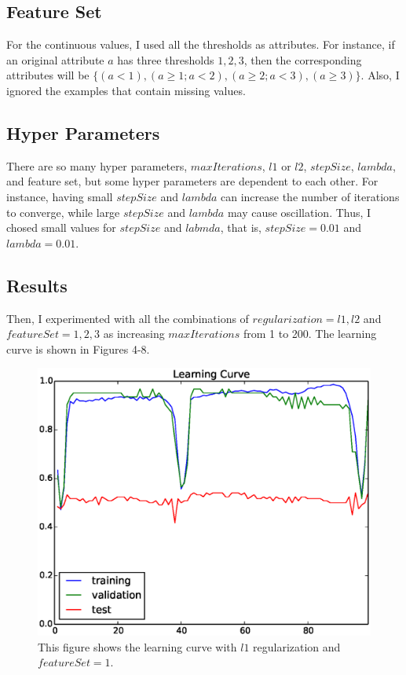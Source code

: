 \subsection*{Feature Set}
For the continuous values, I used all the thresholds as attributes. For instance, if an original attribute $a$ has three thresholds ${1, 2, 3}$, then the corresponding attributes will be $\{(a<1),(a\ge 1; a<2),(a\ge 2; a<3),(a\ge 3)\}$. Also, I ignored the examples that contain missing values.

\subsection*{Hyper Parameters}
There are so many hyper parameters, $maxIterations$, $l1$ or $l2$, $stepSize$, $lambda$, and feature set, but some hyper parameters are dependent to each other. For instance, having small $stepSize$ and $lambda$ can increase the number of iterations to converge, while large $stepSize$ and $lambda$ may cause oscillation. Thus, I chosed small values for $stepSize$ and $labmda$, that is, $stepSize=0.01$ and $lambda=0.01$. 

\subsection*{Results}
Then, I experimented with all the combinations of $regularization=l1,l2$ and $featureSet=1,2,3$ as increasing $maxIterations$ from 1 to 200. The learning curve is shown in Figures 4-8.

\begin{figure}[hbtp]
\centering
\includegraphics[width=140mm]{learning_curve_l1_1}
\caption{This figure shows the learning curve with $l1$ regularization and $featureSet=1$.}
\label{fig:learning_curve_l1_1}
\end{figure}

